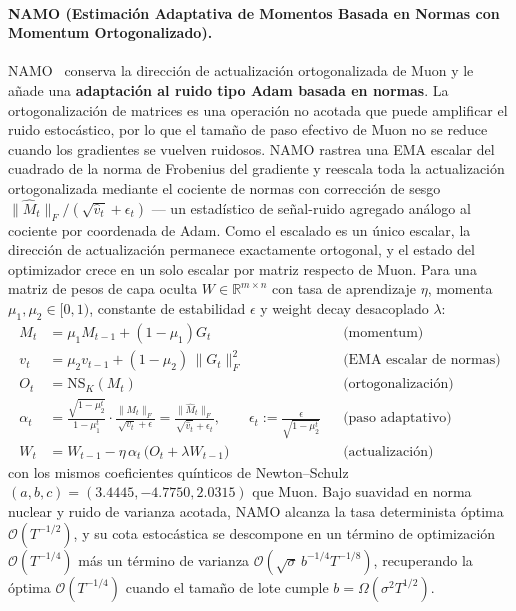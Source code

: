 \paragraph{NAMO (Estimación Adaptativa de Momentos Basada en Normas con Momentum Ortogonalizado).}
NAMO~\citep{zhang_namo_2026} conserva la dirección de actualización ortogonalizada de
Muon y le añade una \textbf{adaptación al ruido tipo Adam basada en normas}. La
ortogonalización de matrices es una operación no acotada que puede amplificar el ruido
estocástico, por lo que el tamaño de paso efectivo de Muon no se reduce cuando los
gradientes se vuelven ruidosos. NAMO rastrea una EMA escalar del cuadrado de la norma de
Frobenius del gradiente y reescala toda la actualización ortogonalizada mediante el
cociente de normas con corrección de sesgo
$\lVert\widehat M_t\rVert_F/(\sqrt{\widehat v_t}+\epsilon_t)$ --- un estadístico de
señal-ruido agregado análogo al cociente por coordenada de Adam. Como el escalado es un
único escalar, la dirección de actualización permanece exactamente ortogonal, y el
estado del optimizador crece en un solo escalar por matriz respecto de Muon. Para una
matriz de pesos de capa oculta $W \in \mathbb{R}^{m\times n}$ con tasa de aprendizaje
$\eta$, momenta $\mu_1,\mu_2 \in [0,1)$, constante de estabilidad $\epsilon$ y weight
decay desacoplado $\lambda$:
\begin{align}
M_t &= \mu_1 M_{t-1} + (1-\mu_1) G_t && \text{(momentum)} \\
v_t &= \mu_2 v_{t-1} + (1-\mu_2)\,\lVert G_t\rVert_F^2 && \text{(EMA escalar de normas)} \\
O_t &= \mathrm{NS}_K(M_t) && \text{(ortogonalización)} \\
\alpha_t &= \frac{\sqrt{1-\mu_2^t}}{1-\mu_1^t}\cdot\frac{\lVert M_t\rVert_F}{\sqrt{v_t}+\epsilon}
   = \frac{\lVert\widehat M_t\rVert_F}{\sqrt{\widehat v_t}+\epsilon_t},
   \qquad \epsilon_t := \frac{\epsilon}{\sqrt{1-\mu_2^t}} && \text{(paso adaptativo)} \\
W_t &= W_{t-1} - \eta\,\alpha_t\,\bigl(O_t + \lambda W_{t-1}\bigr) && \text{(actualización)}
\end{align}
con los mismos coeficientes quínticos de Newton--Schulz $(a,b,c)=(3.4445,-4.7750,2.0315)$
que Muon. Bajo suavidad en norma nuclear y ruido de varianza acotada, NAMO alcanza la
tasa determinista óptima $\mathcal{O}(T^{-1/2})$, y su cota estocástica se descompone en
un término de optimización $\mathcal{O}(T^{-1/4})$ más un término de varianza
$\mathcal{O}(\sqrt{\sigma}\,b^{-1/4}T^{-1/8})$, recuperando la óptima $\mathcal{O}(T^{-1/4})$
cuando el tamaño de lote cumple $b=\Omega(\sigma^2 T^{1/2})$.

